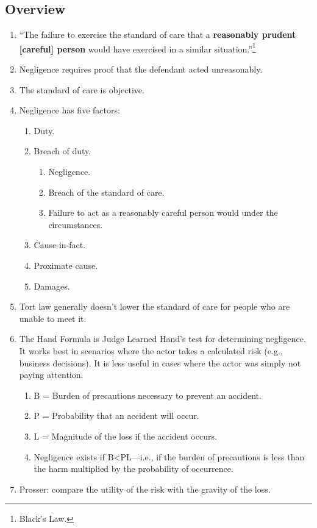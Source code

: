 \subsection{Overview}

\begin{enumerate}
    \item ``The failure to exercise the standard of care that a 
    \textbf{reasonably prudent [careful] person} would have exercised in a 
    similar situation.''\footnote{Black's Law.}
    \item Negligence requires proof that the defendant acted unreasonably.
    \item The standard of care is objective.
    \item Negligence has five factors:
    \begin{enumerate}
        \item Duty.
        \item Breach of duty.
        \begin{enumerate}
            \item Negligence.
            \item Breach of the standard of care.
            \item Failure to act as a reasonably careful person would under 
            the circumstances.
        \end{enumerate}
        \item Cause-in-fact.
        \item Proximate cause.
        \item Damages.
    \end{enumerate}
    \item Tort law generally doesn't lower the standard of care for people who 
    are unable to meet it.
    \item The Hand Formula is Judge Learned Hand's test for determining 
    negligence. It works best in scenarios where the actor takes a calculated 
    risk (e.g., business decisions). It is less useful in cases where the 
    actor was simply not paying attention.
    \begin{enumerate}
        \item B = Burden of precautions necessary to prevent an accident.
        \item P = Probability that an accident will occur.
        \item L = Magnitude of the loss if the accident occurs.
        \item Negligence exists if B\textless PL---i.e., if the burden of 
        precautions is less than the harm multiplied by the probability of 
        occurrence.
    \end{enumerate}
    \item Prosser: compare the utility of the risk with the gravity of the 
    loss.
\end{enumerate}

